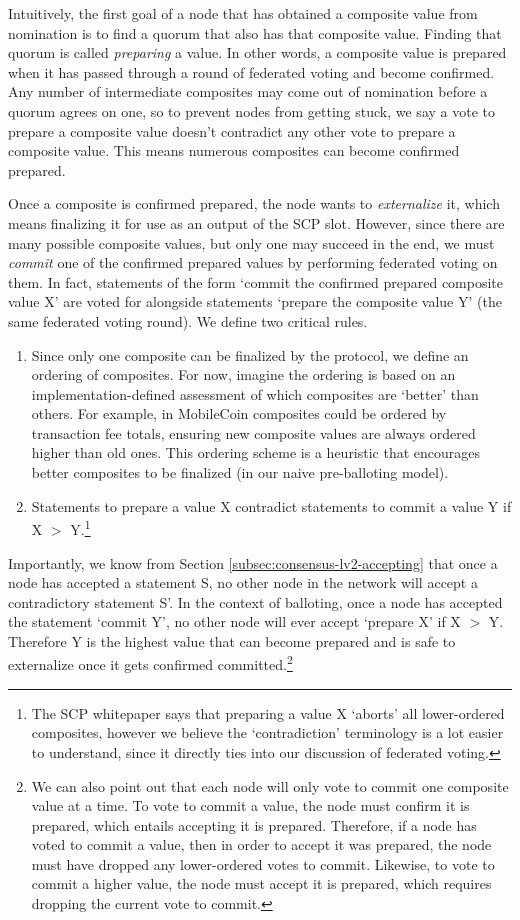 Intuitively, the first goal of a node that has obtained a composite value from nomination is to find a quorum that also has that composite value. Finding that quorum is called {\em preparing} a value. In other words, a composite value is prepared when it has passed through a round of federated voting and become confirmed. Any number of intermediate composites may come out of nomination before a quorum agrees on one, so to prevent nodes from getting stuck, we say a vote to prepare a composite value doesn't contradict any other vote to prepare a composite value. This means numerous composites can become confirmed prepared.

Once a composite is confirmed prepared, the node wants to {\em externalize} it, which means finalizing it for use as an output of the SCP slot. However, since there are many possible composite values, but only one may succeed in the end, we must {\em commit} one of the confirmed prepared values by performing federated voting on them. In fact, statements of the form `commit the confirmed prepared composite value X' are voted for alongside statements `prepare the composite value Y' (the same federated voting round). We define two critical rules.
\begin{enumerate}
    \item Since only one composite can be finalized by the protocol, we define an ordering of composites. For now, imagine the ordering is based on an implementation-defined assessment of which composites are `better' than others. For example, in MobileCoin composites could be ordered by transaction fee totals, ensuring new composite values are always ordered higher than old ones. This ordering scheme is a heuristic that encourages better composites to be finalized (in our naive pre-balloting model).

    \item Statements to prepare a value X contradict statements to commit a value Y if X $>$ Y.\footnote{The SCP whitepaper \cite{stellar-consensus-protocol} says that preparing a value X `aborts' all lower-ordered composites, however we believe the `contradiction' terminology is a lot easier to understand, since it directly ties into our discussion of federated voting.}
\end{enumerate}

Importantly, we know from Section \ref{subsec:consensus-lv2-accepting} that once a node has accepted a statement S, no other node in the network will accept a contradictory statement S'. In the context of balloting, once a node has accepted the statement `commit Y', no other node will ever accept `prepare X' if X $>$ Y. Therefore Y is the highest value that can become prepared and is safe to externalize once it gets confirmed committed.\footnote{We can also point out that each node will only vote to commit one composite value at a time. To vote to commit a value, the node must confirm it is prepared, which entails accepting it is prepared. Therefore, if a node has voted to commit a value, then in order to accept it was prepared, the node must have dropped any lower-ordered votes to commit. Likewise, to vote to commit a higher value, the node must accept it is prepared, which requires dropping the current vote to commit.}

